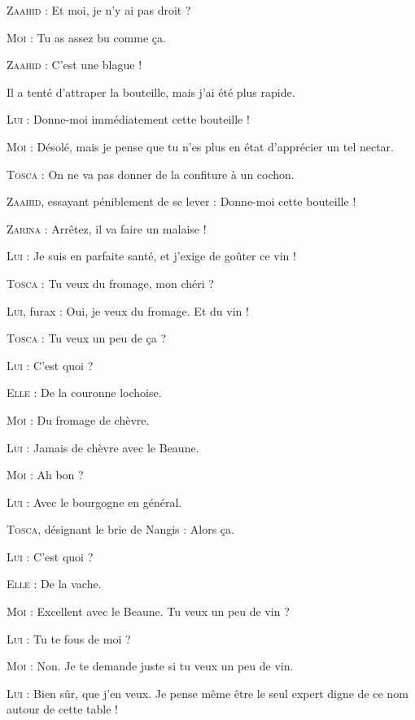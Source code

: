 \begin{dialogue}

\textsc{Zaahid} : Et moi, je n’y ai pas droit ?

\textsc{Moi} : Tu as assez bu comme ça.

\textsc{Zaahid} : C’est une blague !

\end{dialogue}

Il a tenté d’attraper la bouteille, mais j’ai été plus rapide.

\begin{dialogue}

\textsc{Lui} : Donne-moi immédiatement cette bouteille !

\textsc{Moi} : Désolé, mais je pense que tu n’es plus en état d’apprécier un tel nectar.

\textsc{Tosca} : On ne va pas donner de la confiture à un cochon.

\textsc{Zaahid}, essayant péniblement de se lever : Donne-moi cette bouteille !

\textsc{Zarina} : Arrêtez, il va faire un malaise !

\textsc{Lui} : Je suis en parfaite santé, et j’exige de goûter ce vin !

\textsc{Tosca} : Tu veux du fromage, mon chéri ?

\textsc{Lui}, furax : Oui, je veux du fromage. Et du vin !

\textsc{Tosca} : Tu veux un peu de ça ?

\textsc{Lui} : C’est quoi ?

\textsc{Elle} : De la couronne lochoise.

\textsc{Moi} : Du fromage de chèvre.

\textsc{Lui} : Jamais de chèvre avec le Beaune.

\textsc{Moi} : Ah bon ?

\textsc{Lui} : Avec le bourgogne en général.

\textsc{Tosca}, désignant le brie de Nangis : Alors ça.

\textsc{Lui} : C’est quoi ?

\textsc{Elle} : De la vache.

\textsc{Moi} : Excellent avec le Beaune. Tu veux un peu de vin ?

\textsc{Lui} : Tu te fous de moi ?

\textsc{Moi} : Non. Je te demande juste si tu veux un peu de vin.

\textsc{Lui} : Bien sûr, que j’en veux. Je pense même être le seul expert digne de ce nom autour de cette table !


\end{dialogue}
